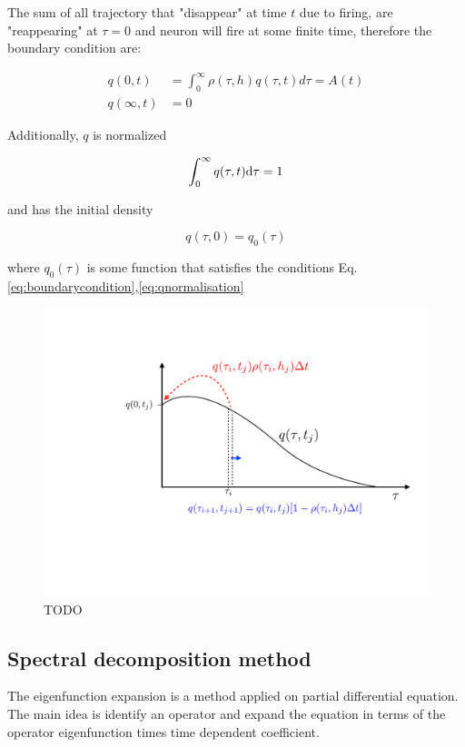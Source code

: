 \documentclass[a4paper,11pt,twoside]{article}
\def \dd  {{\rm d}}
\numberwithin{equation}{section}
\begin{document}
The sum of all trajectory that "disappear" at time $t$ due to firing, are "reappearing" at $\tau=0$ and  neuron will fire at some finite time, therefore the boundary condition are:

\begin{align}
\label{eq:boundarycondition}
q(0,t)&=\int_{0}^{\infty}\rho(\tau,h)q(\tau,t)d\tau=A(t) \\
q(\infty,t)&=0
\end{align}

Additionally, $q$ is normalized

\begin{equation}
\label{eq:qnormalisation}
\int_0^\infty q(\tau,t)\dd \tau = 1
\end{equation}

and has the initial density

\begin{equation}
\label{eq:qinitial}
q(\tau,0)=q_0(\tau)
\end{equation}

where $q_0(\tau)$ is some function that satisfies the conditions Eq.\eqref{eq:boundarycondition},\eqref{eq:qnormalisation}


\cite{Ger00,ChiGra07}


\begin{figure}
	\centering
	\includegraphics[width=0.7\linewidth]{qtau.pdf}
	\caption{TODO
	}
	\label{fig:qtau}
\end{figure}



\subsection{Spectral decomposition method}

The  eigenfunction expansion is a method applied on partial differential equation. The main idea is identify an operator and expand the equation in terms of the operator eigenfunction times time dependent coefficient. 
\end{document}
